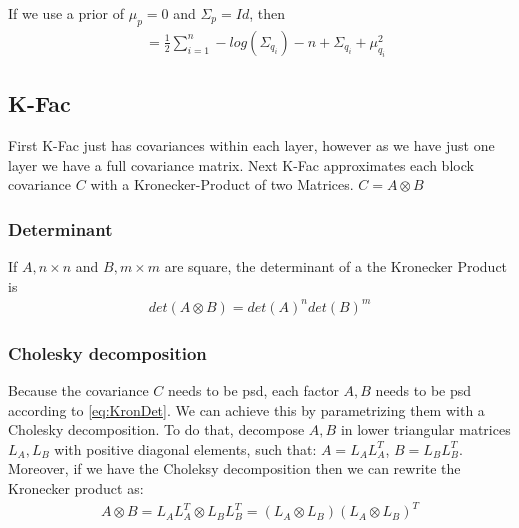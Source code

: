 \documentclass[a4paper]{scrartcl}
\begin{document}
      If we use a prior of $\mu_p=0$ and $\Sigma_p=Id$, then
      \begin{align}
          &= \frac{1}{2} \sum_{i=1}^n - log(\Sigma_{q_i}) - n + \Sigma_{q_i} +  \mu_{q_i}^2
      \end{align}
          

  \subsection{K-Fac}
      First K-Fac just has covariances within each layer, however as we have
      just one layer we have a full covariance matrix.
      Next K-Fac approximates each block covariance $C$ with a Kronecker-Product of two Matrices.
      $C= A \otimes B$

      \subsubsection{Determinant}
        If $A, n\times n$ and $B, m \times m$ are square, the determinant of a the Kronecker Product is
        \begin{align}\label{eq:KronDet}
          det(A \otimes B) = det(A)^n det(B)^m
        \end{align}
        
      \subsubsection{Cholesky decomposition}
        Because the covariance $C$ needs to be psd, each factor $A,B$ needs to be
        psd according to \ref{eq:KronDet}. We can achieve this by parametrizing them with a Cholesky
        decomposition. To do that, decompose $A,B$ in lower triangular matrices
        $L_A, L_B$ with positive diagonal elements, such that: $A=L_AL_A^T$,
        $B=L_BL_B^T$.
        Moreover, if we have the Choleksy decomposition then we can rewrite the Kronecker product as:
        \begin{align}\label{eq:CholKron}
          A \otimes B = L_AL_A^T \otimes L_BL_B^T = (L_A \otimes L_B) (L_A \otimes L_B)^T
        \end{align}
        
\end{document}

